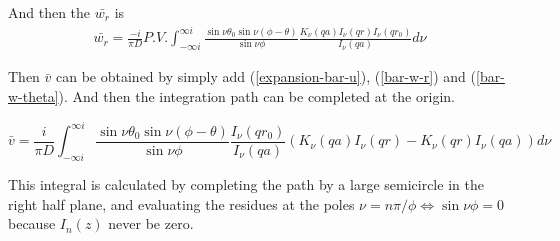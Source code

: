 \documentclass{article}
\begin{document}

And then the $\bar{w_r}$ is
\begin{eqnarray} 
    \bar{w_r} = \frac{-i}{\pi D}P.V.\int^{\infty i}_{-\infty i}
              \frac{\sin\nu\theta_0\sin\nu(\phi - \theta)}{\sin\nu\phi}
              \frac{K_\nu(qa)I_\nu(qr)I_\nu(qr_0)}{I_\nu(qa)}d\nu
              \label{bar-w-r}
\end{eqnarray}

Then $\bar{v}$ can be obtained by simply add (\ref{expansion-bar-u}), (\ref{bar-w-r}) and
 (\ref{bar-w-theta}). And then the integration path can be completed at the 
 origin.

\begin{equation} \label{bar-v}
    \bar{v} = \frac{i}{\pi D}\int^{\infty i}_{-\infty i}
              \frac{\sin\nu\theta_0\sin\nu(\phi - \theta)}{\sin\nu\phi}
              \frac{I_\nu(qr_0)}{I_\nu(qa)}
              \left(K_\nu(qa)I_\nu(qr) - K_\nu(qr)I_\nu(qa)\right)d\nu
\end{equation}

This integral is calculated by completing the path by a large semicircle in the
 right half plane, and evaluating the residues at the poles
 $\nu = n\pi / \phi \Leftrightarrow \sin\nu\phi = 0 $ because $I_n(z)$ never be zero.
\end{document}
